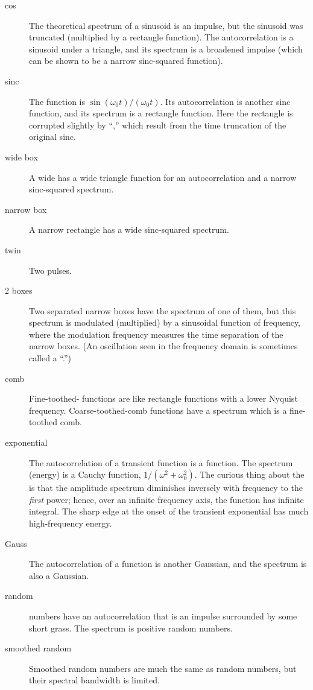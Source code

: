 \begin{description}
\item [cos]
The theoretical spectrum of a sinusoid is an impulse,
but the sinusoid was truncated (multiplied by a rectangle function).
The autocorrelation is a sinusoid under a triangle,
and its spectrum is a broadened impulse
(which can be shown to be a narrow sinc-squared function).
\item [sinc]
The  function is $\sin(\omega_0 t)/(\omega_0 t)$.
Its autocorrelation is another sinc function, and its spectrum
is a rectangle function.
Here the rectangle is  corrupted slightly by
``,''
which result from the time truncation of the original sinc.
\item [wide box]
A wide
has a wide triangle function for
an autocorrelation and a narrow sinc-squared spectrum.
\item [narrow box]
A narrow rectangle has a wide sinc-squared spectrum.
\item [twin] Two pulses.
\item [2 boxes]
Two separated narrow boxes have the spectrum of one of them,
but this spectrum is modulated (multiplied) by a sinusoidal function
of frequency, where the modulation frequency measures the
time separation of the narrow boxes.
(An oscillation seen in the frequency domain
is sometimes called a ``.'')
\item [comb]
Fine-toothed-
functions are like rectangle functions with a lower Nyquist frequency.
Coarse-toothed-comb functions have a spectrum which is a fine-toothed comb.
\item [exponential]
The autocorrelation of a transient  function
is a  function.
The spectrum (energy) is a Cauchy function, $1/(\omega^2+\omega_0^2)$.
The curious thing about the
is that the amplitude spectrum
diminishes inversely with frequency to the {\em  first} power;
hence, over an infinite frequency axis, the function has infinite integral.
The sharp edge at the onset of the transient exponential
has much high-frequency energy.
\item [Gauss]
The autocorrelation of a 
function is another Gaussian,
and the spectrum is also a Gaussian.
\item [random]
numbers have an autocorrelation that is an impulse
surrounded by some short grass.
The spectrum is positive random numbers.
\item [smoothed random]
Smoothed random numbers are much the same as random numbers, 
but their spectral bandwidth is limited.
\end{description}



